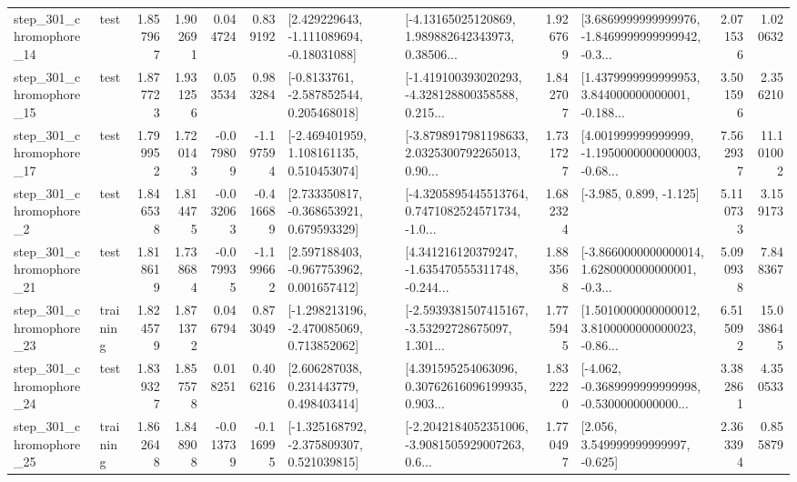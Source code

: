\begin{tabular}{llrrrrllrlrr}
  step\_301\_chromophore\_14 &      test &      1.857967 &    1.902691 &      0.044724 &  0.839192 &    [2.429229643, -1.111089694, -0.18031088] &  [-4.13165025120869, 1.989882642343973, 0.38506... &       1.926769 &  [3.6869999999999976, -1.8469999999999942, -0.3... &            2.071536 &          1.020632 \\
  step\_301\_chromophore\_15 &      test &      1.877723 &    1.931256 &      0.053534 &  0.983284 &     [-0.8133761, -2.587852544, 0.205468018] &  [-1.419100393020293, -4.328128800358588, 0.215... &       1.842707 &  [1.4379999999999953, 3.844000000000001, -0.188... &            3.501596 &          2.356210 \\
  step\_301\_chromophore\_17 &      test &      1.799952 &    1.720143 &     -0.079809 & -1.197594 &    [-2.469401959, 1.108161135, 0.510453074] &  [-3.8798917981198633, 2.0325300792265013, 0.90... &       1.731727 &  [4.001999999999999, -1.1950000000000003, -0.68... &            7.562937 &         11.101002 \\
   step\_301\_chromophore\_2 &      test &      1.846538 &    1.814475 &     -0.032063 & -0.416689 &    [2.733350817, -0.368653921, 0.679593329] &  [-4.3205895445513764, 0.7471082524571734, -1.0... &       1.682324 &                            [-3.985, 0.899, -1.125] &            5.110733 &          3.159173 \\
  step\_301\_chromophore\_21 &      test &      1.818619 &    1.738684 &     -0.079935 & -1.199662 &    [2.597188403, -0.967753962, 0.001657412] &  [4.341216120379247, -1.635470555311748, -0.244... &       1.883568 &  [-3.8660000000000014, 1.6280000000000001, -0.3... &            5.090938 &          7.848367 \\
  step\_301\_chromophore\_23 &  training &      1.824579 &    1.871372 &      0.046794 &  0.873049 &   [-1.298213196, -2.470085069, 0.713852062] &  [-2.5939381507415167, -3.53292728675097, 1.301... &       1.775945 &  [1.5010000000000012, 3.8100000000000023, -0.86... &            6.515092 &         15.038645 \\
  step\_301\_chromophore\_24 &      test &      1.839327 &    1.857578 &      0.018251 &  0.406216 &     [2.606287038, 0.231443779, 0.498403414] &  [4.391595254063096, 0.30762616096199935, 0.903... &       1.832220 &  [-4.062, -0.3689999999999998, -0.5300000000000... &            3.382861 &          4.350533 \\
  step\_301\_chromophore\_25 &  training &      1.862648 &    1.848908 &     -0.013739 & -0.116995 &   [-1.325168792, -2.375809307, 0.521039815] &  [-2.2042184052351006, -3.9081505929007263, 0.6... &       1.770497 &                 [2.056, 3.549999999999997, -0.625] &            2.363394 &          0.855879 \\

\end{tabular}

